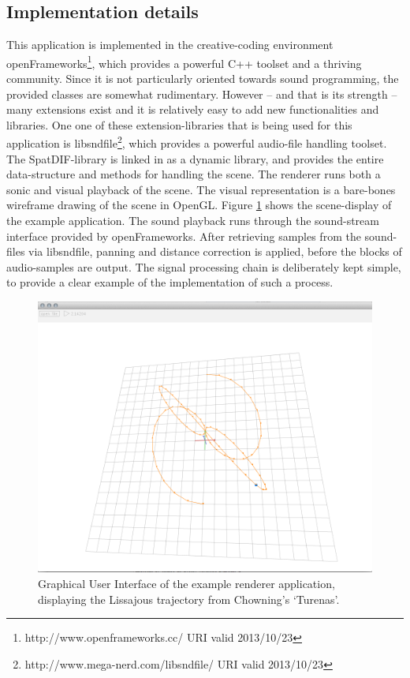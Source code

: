 \documentclass[a4paper]{article}
\begin{document}
\subsection{Implementation details}

This application is implemented in the creative-coding environment openFrameworks\footnote{http://www.openframeworks.cc/ URI valid 2013/10/23}, which provides a powerful C++ toolset and a thriving community.
Since it is not particularly oriented towards sound programming, the provided classes are somewhat rudimentary.
However -- and that is its strength -- many extensions exist and it is relatively easy to add new functionalities and libraries.
One one of these extension-libraries that is being used for this application is libsndfile\footnote{http://www.mega-nerd.com/libsndfile/ URI valid 2013/10/23}, which provides a powerful audio-file handling toolset.
The SpatDIF-library is linked in as a dynamic library, and provides the entire data-structure and methods for handling the scene.
The renderer runs both a sonic and visual playback of the scene.
The visual representation is a bare-bones wireframe drawing of the scene in OpenGL.
Figure \ref{fig:screenshot} shows the scene-display of the example application.
The sound playback runs through the sound-stream interface provided by openFrameworks.
After retrieving samples from the sound-files via libsndfile, panning and distance correction is applied, before the blocks of audio-samples are output.
The signal processing chain is deliberately kept simple, to provide a clear example of the implementation of such a process.

\begin{figure}[h]
\centerline{
	\includegraphics[width=\columnwidth]{SpatDIFrenderer_screenshot2}}
\caption{Graphical User Interface of the example renderer application, displaying the Lissajous trajectory from Chowning's `Turenas'. 
}
\label{fig:screenshot}
\end{figure}
\end{document}
